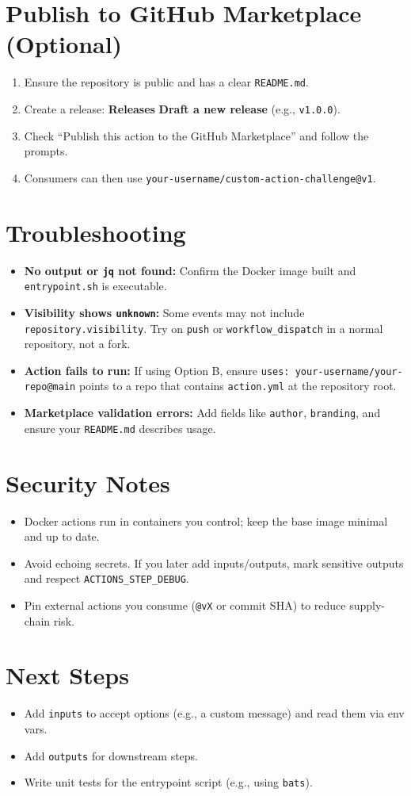 \documentclass[11pt]{article}
\begin{document}
\section{Publish to GitHub Marketplace (Optional)}
\begin{enumerate}
  \item Ensure the repository is public and has a clear \texttt{README.md}.
  \item Create a release: \textbf{Releases} \textrightarrow{} \textbf{Draft a new release} (e.g., \texttt{v1.0.0}).
  \item Check ``Publish this action to the GitHub Marketplace'' and follow the prompts.
  \item Consumers can then use \texttt{your-username/custom-action-challenge@v1}.
\end{enumerate}

\section{Troubleshooting}
\begin{itemize}
  \item \textbf{No output or \texttt{jq} not found:} Confirm the Docker image built and \texttt{entrypoint.sh} is executable.
  \item \textbf{Visibility shows \texttt{unknown}:} Some events may not include \texttt{repository.visibility}. Try on \texttt{push} or \texttt{workflow\_dispatch} in a normal repository, not a fork.
  \item \textbf{Action fails to run:} If using Option B, ensure \texttt{uses: your-username/your-repo@main} points to a repo that contains \texttt{action.yml} at the repository root.
  \item \textbf{Marketplace validation errors:} Add fields like \texttt{author}, \texttt{branding}, and ensure your \texttt{README.md} describes usage.
\end{itemize}
\clearpage

\section*{Security Notes}
\begin{itemize}
  \item Docker actions run in containers you control; keep the base image minimal and up to date.
  \item Avoid echoing secrets. If you later add inputs/outputs, mark sensitive outputs and respect \texttt{ACTIONS\_STEP\_DEBUG}.
  \item Pin external actions you consume (\texttt{@vX} or commit SHA) to reduce supply-chain risk.
\end{itemize}

\section*{Next Steps}
\begin{itemize}
  \item Add \texttt{inputs} to accept options (e.g., a custom message) and read them via env vars.
  \item Add \texttt{outputs} for downstream steps.
  \item Write unit tests for the entrypoint script (e.g., using \texttt{bats}).
\end{itemize}
\end{document}
